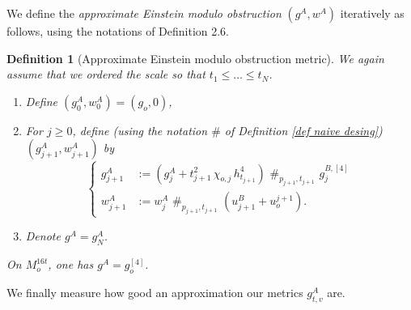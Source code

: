 \documentclass[11pt,reqno]{amsart}
\numberwithin{equation}{section}
\newtheorem{defn}[thm]{Definition}
\theoremstyle{definition}
\theoremstyle{remark}
\begin{document}
We define the \textit{approximate Einstein modulo obstruction} $(g^A,w^A)$ iteratively as follows, using the notations of Definition 2.6.
\begin{defn}[Approximate Einstein modulo obstruction metric]\label{defn:approximate metric}
     We again assume that we ordered the scale so that $t_1\leqslant\dots\leqslant t_N$.
\begin{enumerate}
    \item Define $(g^A_0,w^A_0) = (g_o,0)$,
    \item For $j\geqslant 0$, define (using the notation $\#$ of Definition \ref{def naive desing}) $(g^A_{j+1},w^A_{j+1})$ by
    \begin{equation}
    \left\{\begin{aligned}
        g^A_{j+1} &:= \left(g^A_{j}+t_{j+1}^2\,\chi_{o,j}\,h^4_{t_{j+1}}\right)\,\,\#_{p_{j+1},t_{j+1}} \,\,g^{B,[4]}_j\\
        w^A_{j+1} &:= w^A_j\,\,\#_{p_{j+1},t_{j+1}}\,\,\left(u^B_{j+1}+u_o^{j+1}\right).
    \end{aligned}\right.
\end{equation}
\item Denote $g^A = g^A_N$.
\end{enumerate}
On $M_o^{16t}$, one has $g^A = g_o^{[4]}$.
\end{defn}

We finally measure how good an approximation our metrics $g^A_{t ,v }$ are.
\end{document}
